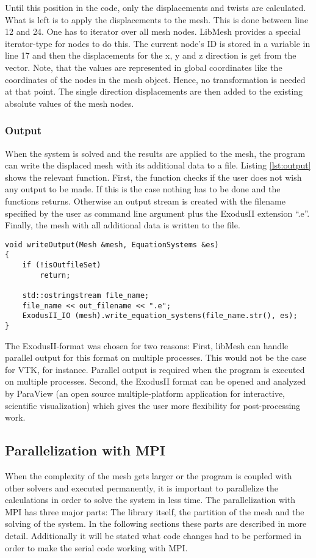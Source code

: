    Until this position in the code, only the displacements and twists are calculated. What is left is to apply the displacements to the mesh. This is done between line 12 and 24. One has to iterator over all mesh nodes. LibMesh provides a special iterator-type for nodes to do this. The current node's ID is stored in a variable in line 17 and then the displacements for the x, y and z direction is get from the vector. Note, that the values are represented in global coordinates like the coordinates of the nodes in the mesh object. Hence, no transformation is needed at that point. The single direction displacements are then added to the existing absolute values of the mesh nodes.

   
   
   
  \subsubsection{Output}\label{sec:Impl-Details-Output}
   When the system is solved and the results are applied to the mesh, the program can write the displaced mesh with its additional data to a file. Listing \ref{lst:output} shows the relevant function. First, the function checks if the user does not wish any output to be made. If this is the case nothing has to be done and the functions returns. Otherwise an output stream is created with the filename specified by the user as command line argument plus the ExodusII extension ``.e''. Finally, the mesh with all additional data is written to the file.
\begin{lstlisting}[caption=Store results in mesh file,label=lst:output,keepspaces=true]
void writeOutput(Mesh &mesh, EquationSystems &es)
{
	if (!isOutfileSet)
		return;
	
	std::ostringstream file_name;
	file_name << out_filename << ".e";	
	ExodusII_IO (mesh).write_equation_systems(file_name.str(), es);
}  
\end{lstlisting}
   The ExodusII-format was chosen for two reasons: First, libMesh can handle parallel output for this format on multiple processes. This would not be the case for VTK, for instance. Parallel output is required when the program is executed on multiple processes. Second, the ExodusII format can be opened and analyzed by ParaView (an open source multiple-platform application for interactive, scientific visualization) which gives the user more flexibility for post-processing work.
   
    
 
 
 \subsection{Parallelization with MPI}\label{sec:Impl-Parallel}
  When the complexity of the mesh gets larger or the program is coupled with other solvers and executed permanently, it is important to parallelize the calculations in order to solve the system in less time. The parallelization with MPI has three major parts: The library itself, the partition of the mesh and the solving of the system. In the following sections these parts are described in more detail. Additionally it will be stated what code changes had to be performed in order to make the serial code working with MPI.
 
